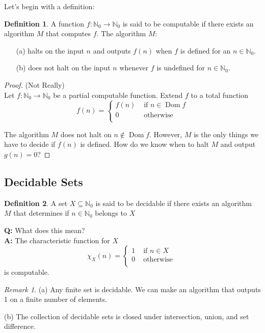 \documentclass[10pt, letterpaper]{article}
\newcommand{\N}{\mathbb{N}}
\theoremstyle{remark}
\newtheorem{rem}{Remark}
\theoremstyle{definition}
\newtheorem{defn}{Definition}
\begin{document}
Let's begin with a definition:

\begin{defn}
	A function $f: \N_0 \rightarrow \N_0$ is said to be computable if there exists an algorithm $M$ that computes $f$. The algorithm $M$:
	\begin{enumerate}
		\item[(a)]  halts on the input $n$ and outputs $f(n)$ when $f$ is defined for an $n \in \N_0$.
		\item[(b)] does not halt on the input $n$ whenever $f$ is undefined for $n \in \N_0$.
	\end{enumerate}
\end{defn}

\begin{proof}(Not Really) \\
Let $f: \N_0 \rightarrow \N_0$ be a partial computable function. Extend $f$ to a total function
\[
	f(n) = \begin{cases}
		f(n) &\text{ if } n \in \operatorname{Dom} f \\
		0 & \text { otherwise}\\
	\end{cases}
\]

The algorithm $M$ does not halt on $n \notin \operatorname{Dom} f$. However, $M$ is the only things we have to decide if $f(n)$ is defined. How do we know when to halt $M$ and output $g(n) = 0$?
\end{proof}

\subsection*{Decidable Sets}

\begin{defn}
	A set $X \subseteq \N_0$ is said to be decidable if there exists an algorithm $M$ that determines if $n \in \N_0$ belongs to $X$
\end{defn}

\noindent \textbf{Q: } What does this mean? \\

\noindent \textbf{A: } The characteristic function for $X$ 
\[
	\chi_X(n) = \begin{cases}
		1 & \text{ if } n \in X \\
		0 & \text{ otherwise } \\
	\end{cases}
\]
is computable.

\begin{rem}
	\item[(a)] Any finite set is decidable. We can make an algorithm that outputs 1 on a finite number of elements.
	\item[(b)] The collection of decidable sets is closed under intersection, union, and set difference.
\end{rem}
\end{document}
